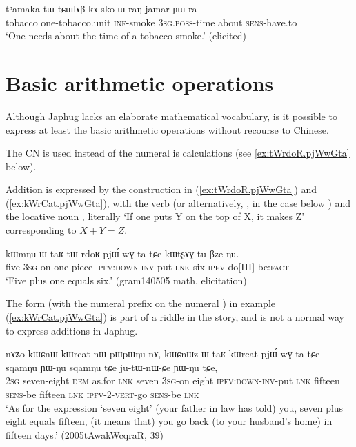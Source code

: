 \begin{exe}
\ex \label{ex:thamaka.tWtCWlAB}
\gll    tʰamaka tɯ-tɕɯlɤβ kɤ-sko ɯ-raŋ jamar ɲɯ-ra \\
tobacco  one-tobacco.unit \textsc{inf}-smoke \textsc{3sg}.\textsc{poss}-time about \textsc{sens}-have.to \\
\glt `One needs about the time of a tobacco smoke.' (elicited)
\end{exe}
    
\section{Basic arithmetic operations} \label{sec:arithmetic}

Although Japhug lacks an elaborate mathematical vocabulary, is it possible to express at least the basic arithmetic operations without recourse to Chinese. 

The CN  is used instead of the numeral  is calculations (see \ref{ex:tWrdoR.pjWwGta} below).

Addition is expressed by the construction in (\ref{ex:tWrdoR.pjWwGta}) and (\ref{ex:kWrCat.pjWwGta}), with the verb  (or alternatively, , in the case below ) and the locative noun , literally  `If one puts Y on the top of X, it makes Z' corresponding to $X+Y=Z$.  

\begin{exe}
\ex \label{ex:tWrdoR.pjWwGta}
\gll kɯmŋu ɯ-taʁ tɯ-rdoʁ pjɯ́-wɣ-ta tɕe kɯtʂɤɣ tu-βze ŋu.  \\
 five \textsc{3sg}-on one-piece \textsc{ipfv}:\textsc{down}-\textsc{inv}-put \textsc{lnk} six \textsc{ipfv}-do[III] be:\textsc{fact} \\
\glt `Five plus one equals six.' (gram140505 math, elicitation)
\end{exe}

The form  (with the numeral prefix  on the numeral ) in example (\ref{ex:kWrCat.pjWwGta}) is part of a riddle in the story, and is not a normal way to express additions in Japhug.

\begin{exe}
\ex \label{ex:kWrCat.pjWwGta}
\gll  nɤʑo kɯɕnɯ-kɯrcat nɯ pɯpɯŋu nɤ, kɯɕnɯz ɯ-taʁ kɯrcat pjɯ́-wɣ-ta tɕe sqamŋu ɲɯ-ŋu sqamŋu tɕe ju-tɯ-nɯ-ɕe ɲɯ-ŋu tɕe, \\
 \textsc{2sg} seven-eight \textsc{dem} as.for \textsc{lnk} seven  \textsc{3sg}-on eight \textsc{ipfv}:\textsc{down}-\textsc{inv}-put \textsc{lnk}  fifteen   \textsc{sens}-be fifteen \textsc{lnk} \textsc{ipfv}-2-\textsc{vert}-go \textsc{sens}-be \textsc{lnk} \\
\glt `As for the expression `seven eight' (your father in law has told) you, seven plus eight equals fifteen, (it means that) you go back (to your husband's home) in fifteen days.' (2005tAwakWcqraR, 39)
\end{exe}

